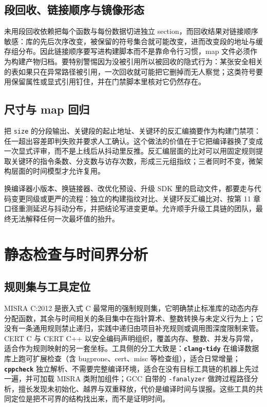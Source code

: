 \documentclass[12pt,a4paper,fontset=fandol]{ctexbook}
\newcommand{\Tp}[1]{\texttt{#1}}
\newcommand{\Lib}[1]{\textbf{\texttt{#1}}}
\begin{document}
\subsection{段回收、链接顺序与镜像形态}

未用段回收依赖把每个函数与每份数据切进独立 section，而回收结果对链接顺序敏感：库的先后次序改变，被保留的符号集合就可能改变，进而改变段的地址与缓存组分布。因此链接顺序要写进构建脚本而不是靠命令行习惯，map 文件必须作为构建产物归档。要特别警惕因为没被引用所以被回收的隐式行为：某张安全相关的表如果只在异常路径被引用，一次回收就可能把它删掉而无人察觉；这类符号要用保留属性或显式引用钉住，并在门禁脚本里核对它仍然存在。

\subsection{尺寸与 map 回归}

把 \Tp{size} 的分段输出、关键段的起止地址、关键环的反汇编摘要作为构建门禁项：任一超出容差即判失败并要求人工确认。这个做法的价值在于它把编译器换了变成一次显式评审，而不是上线后从抖动里反推。反汇编层面的比对可以用固定规则提取关键环的指令条数、分支数与访存次数，形成三元组指纹；三者同时不变，微架构层面的时间模型才允许复用。

\begin{bestpractice}[title={把工具链变更当成一次设计变更}]
换编译器小版本、换链接器、改优化预设、升级 SDK 里的启动文件，都要走与代码变更同级或更严的流程：独立的构建指纹对比、关键环反汇编比对、按第 11 章口径重测延迟与抖动分布，并把结论写进变更单。允许顺手升级工具链的团队，最终无法解释任何一次最坏值的抬升。
\end{bestpractice}

\section{静态检查与时间界分析}
\label{sec:ch13-static-wcet}

\subsection{规则集与工具定位}

MISRA C:2012 是嵌入式 C 最常用的强制规则集，它明确禁止标准库的动态内存分配函数，其余与时间相关的条目集中在指针算术、整数转换与未定义行为上；它没有一条通用规则禁止递归，实践中递归由项目补充规则或调用图深度限制来管。CERT C 与 CERT C++ 以安全编码声明组织，覆盖内存、整数、并发与异常，适合作为规则映射的另一套坐标。工具侧的分工大致是：\Lib{clang-tidy} 在编译数据库上跑可扩展检查（含 bugprone、cert、misc 等检查组），适合日常增量；\Lib{cppcheck} 独立解析、不需要完整编译环境，适合在没有目标工具链的机器上先过一遍，并可加载 MISRA 类附加组件；GCC 自带的 \Tp{-fanalyzer} 做跨过程路径分析，擅长发现未初始化、越界与双重释放，代价是编译时间与误报。这些工具的共同定位是把不可界的结构找出来，而不是证明时间。
\end{document}
